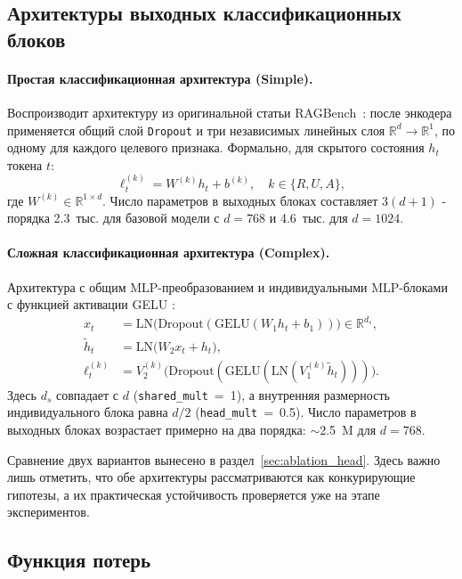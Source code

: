 \subsection{Архитектуры выходных классификационных блоков}
\label{sec:heads}

\paragraph{Простая классификационная архитектура (Simple).} Воспроизводит архитектуру из оригинальной статьи
 RAGBench~\cite{friel2024ragbench}: после энкодера применяется общий слой
  \texttt{Dropout} \cite{srivastava2014dropout} и три независимых линейных слоя $\mathbb{R}^d \to \mathbb{R}^1$, 
  по одному для каждого целевого признака. 
Формально, для скрытого состояния $h_t$ токена $t$:
\[
\ell^{(k)}_t = W^{(k)} h_t + b^{(k)}, \quad k \in \{R, U, A\},
\]
где $W^{(k)} \in \mathbb{R}^{1 \times d}$. Число параметров в выходных блоках составляет $3(d+1)$ - порядка 2.3~тыс. для базовой модели с $d=768$ и 4.6~тыс. для $d=1024$.

\paragraph{Сложная классификационная архитектура (Complex).} Архитектура с общим MLP-преобразованием \cite{MLP} и индивидуальными 
MLP-блоками с функцией активации GELU \cite{hendrycks2016gaussian}:
\begin{align*}
x_t &= \mathrm{LN}\bigl(\mathrm{Dropout}(\mathrm{GELU}(W_1 h_t + b_1))\bigr) \in \mathbb{R}^{d_s}, \\
\tilde{h}_t &= \mathrm{LN}\bigl(W_2 x_t + h_t\bigr),\\ 
\ell^{(k)}_t &= V_2^{(k)} \bigl(\mathrm{Dropout}(\mathrm{GELU}(\mathrm{LN}(V_1^{(k)} \tilde{h}_t)))\bigr).
\end{align*}
Здесь $d_s$ совпадает с $d$ (\texttt{shared\_mult}~=~1), а внутренняя размерность
 индивидуального блока равна $d/2$ (\texttt{head\_mult}~=~0.5). Число параметров в выходных блоках возрастает
  примерно на два порядка: $\sim$2.5~M для $d=768$.

Сравнение двух вариантов вынесено в раздел~\ref{sec:ablation_head}. Здесь важно лишь
отметить, что обе архитектуры рассматриваются как конкурирующие гипотезы, а их
практическая устойчивость проверяется уже на этапе экспериментов.

\subsection{Функция потерь}

